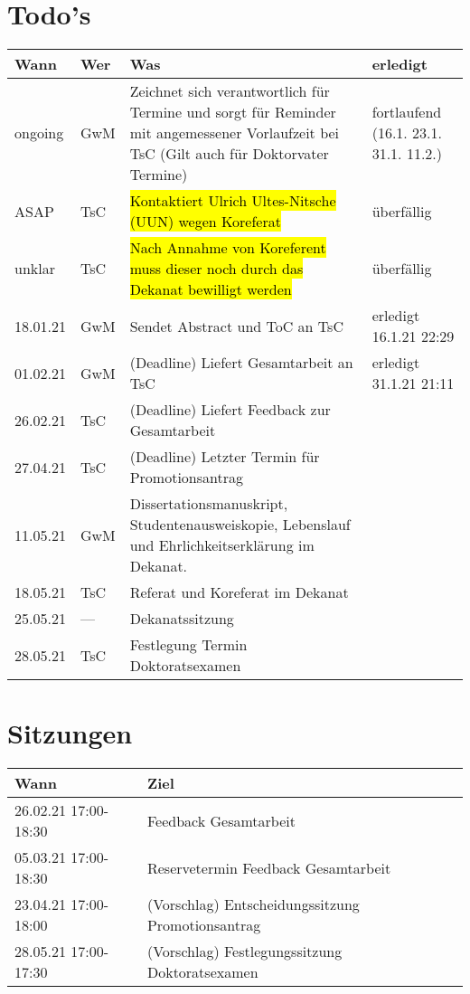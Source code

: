 \documentclass[a4paper,10pt,english]{extarticle}
\begin{document}
\section{Todo's}
\begin{tabular}{|l|l|l|p{5cm}|}\hline
	Wann & Wer & Was & erledigt\\\hline
	ongoing & GwM & Zeichnet sich verantwortlich für Termine und sorgt für Reminder mit angemessener Vorlaufzeit bei TsC (Gilt auch für Doktorvater Termine) &fortlaufend (16.1. 23.1. 31.1. 11.2.)\\
	ASAP    & TsC & \hl{Kontaktiert Ulrich Ultes-Nitsche (UUN) wegen Koreferat}                          & überfällig\\
	unklar  & TsC & \hl{Nach Annahme von Koreferent muss dieser noch durch das Dekanat bewilligt werden} & überfällig\\
	18.01.21& GwM & Sendet Abstract und ToC an TsC												         & erledigt 16.1.21 22:29\\
	01.02.21& GwM & (Deadline) Liefert Gesamtarbeit an TsC										         & erledigt 31.1.21 21:11\\
	26.02.21& TsC & (Deadline) Liefert Feedback zur Gesamtarbeit                                         &\\
	27.04.21& TsC & (Deadline) Letzter Termin für Promotionsantrag                                       &\\
	11.05.21& GwM & Dissertationsmanuskript, Studentenausweiskopie, Lebenslauf und Ehrlichkeitserklärung im Dekanat.&\\
	18.05.21& TsC & Referat und Koreferat im Dekanat                                                     &\\
	25.05.21& --- & Dekanatssitzung                                                                      &\\
	28.05.21& TsC & Festlegung Termin Doktoratsexamen                                                    &\\\hline
\end{tabular}

\section{Sitzungen}
\begin{tabular}{|l|l|}\hline
	Wann & Ziel \\\hline
	26.02.21 17:00-18:30 & Feedback Gesamtarbeit \\
	05.03.21 17:00-18:30 & Reservetermin Feedback Gesamtarbeit\\
	23.04.21 17:00-18:00 & (Vorschlag) Entscheidungssitzung Promotionsantrag\\
	28.05.21 17:00-17:30 & (Vorschlag) Festlegungssitzung Doktoratsexamen\\
	\hline
\end{tabular}
\end{document}
